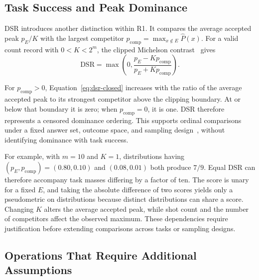 \documentclass[10pt,conference]{IEEEtran}
\begin{document}
\subsection{Task Success and Peak Dominance}
\label{sec:dsr}

DSR introduces another distinction within R1. It compares the average accepted peak $p_E/K$ with the largest competitor $p_{\mathrm{comp}}=\max_{x\notin E}\widehat P(x)$. For a valid count record with $0<K<2^m$, the clipped Michelson contrast~\cite{michelson1927} gives
\begin{equation}
\mathrm{DSR}=\max\left(0,\frac{p_E-Kp_{\mathrm{comp}}}{p_E+Kp_{\mathrm{comp}}}\right).
\label{eq:dsr-closed}
\end{equation}

For $p_{\mathrm{comp}}>0$, Equation~\ref{eq:dsr-closed} increases with the ratio of the average accepted peak to its strongest competitor above the clipping boundary. At or below that boundary it is zero; when $p_{\mathrm{comp}}=0$, it is one. DSR therefore represents a censored dominance ordering. This supports ordinal comparisons under a fixed answer set, outcome space, and sampling design~\cite{fentonBieman2015}, without identifying dominance with task success.

For example, with $m=10$ and $K=1$, distributions having $(p_E,p_{\mathrm{comp}})=(0.80,0.10)$ and $(0.08,0.01)$ both produce $7/9$. Equal DSR can therefore accompany task masses differing by a factor of ten. The score is unary for a fixed $E$, and taking the absolute difference of two scores yields only a pseudometric on distributions because distinct distributions can share a score. Changing $K$ alters the average accepted peak, while shot count and the number of competitors affect the observed maximum. These dependencies require justification before extending comparisons across tasks or sampling designs.

\subsection{Operations That Require Additional Assumptions}
\label{sec:operations}
\end{document}

